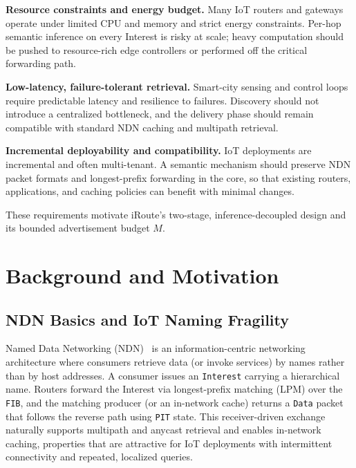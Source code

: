\documentclass[journal]{IEEEtran}
\newcommand{\sysname}{iRoute}
\begin{document}
\textbf{Resource constraints and energy budget.}
Many IoT routers and gateways operate under limited CPU and memory and strict energy constraints.
Per-hop semantic inference on every Interest is risky at scale; heavy computation should be pushed to resource-rich edge controllers or performed off the critical forwarding path.

\textbf{Low-latency, failure-tolerant retrieval.}
Smart-city sensing and control loops require predictable latency and resilience to failures.
Discovery should not introduce a centralized bottleneck, and the delivery phase should remain compatible with standard NDN caching and multipath retrieval.

\textbf{Incremental deployability and compatibility.}
IoT deployments are incremental and often multi-tenant.
A semantic mechanism should preserve NDN packet formats and longest-prefix forwarding in the core, so that existing routers, applications, and caching policies can benefit with minimal changes.

These requirements motivate \sysname{}'s two-stage, inference-decoupled design and its bounded advertisement budget $M$.



\section{Background and Motivation}
\label{sec:background}

\subsection{NDN Basics and IoT Naming Fragility}
\label{sec:bg_ndn}

Named Data Networking (NDN)~\cite{ndn} is an information-centric networking architecture where consumers retrieve data (or invoke services) by names rather than by host addresses. A consumer issues an \texttt{Interest} carrying a hierarchical name. Routers forward the Interest via longest-prefix matching (LPM) over the \texttt{FIB}, and the matching producer (or an in-network cache) returns a \texttt{Data} packet that follows the reverse path using \texttt{PIT} state. This receiver-driven exchange naturally supports multipath and anycast retrieval and enables in-network caching, properties that are attractive for IoT deployments with intermittent connectivity and repeated, localized queries.
\end{document}
